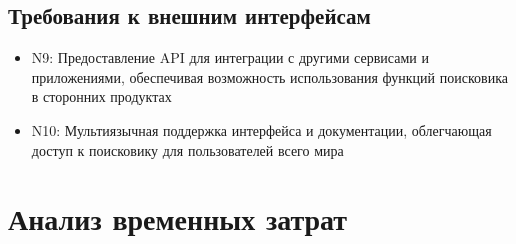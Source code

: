 \documentclass[12pt,a4paper]{article}
\begin{document}
\subsection{Требования к внешним интерфейсам}
\begin{itemize}
    \item N9: Предоставление API для интеграции с другими сервисами и приложениями, обеспечивая возможность использования функций поисковика в сторонних продуктах
    \item N10: Мультиязычная поддержка интерфейса и документации, облегчающая доступ к поисковику для пользователей всего мира
\end{itemize}
\section{Анализ временных затрат}
\end{document}
